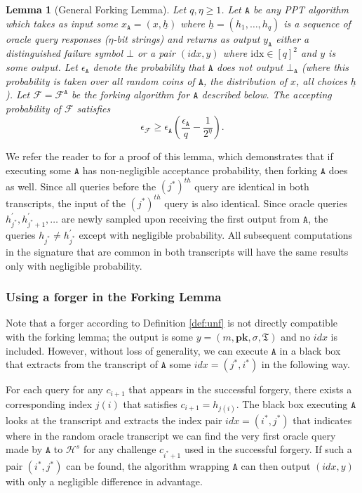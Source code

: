 \documentclass{mrl}
\theoremstyle{plain}
\newtheorem{lemma}{Lemma}[section]
\theoremstyle{definition}
\begin{document}
\begin{lemma}[General Forking Lemma]\label{lem:fork}
Let $q, \eta \geq 1$. Let $\texttt{A}$ be any PPT algorithm which takes as input some $x_\texttt{A} = (x, \underline{h})$ where $\underline{h} = (h_1, \ldots, h_q)$ is a sequence of oracle query responses ($\eta$-bit strings) and returns as output $y_{\texttt{A}}$ either a distinguished failure symbol $\bot$ or a pair $(\textit{idx}, y)$ where $\text{idx} \in [q]^2$ and $y$ is some output. Let $\epsilon_{\texttt{A}}$ denote the probability that $\texttt{A}$ does not output $\bot_{\texttt{A}}$ (where this probability is taken over all random coins of $\texttt{A}$, the distribution of $x$, all choices $\underline{h}$). Let $\mathcal{F} = \mathcal{F}^{\texttt{A}}$ be the forking algorithm for $\texttt{A}$ described below. The accepting probability of $\mathcal{F}$ satisfies \[\epsilon_{\mathcal{F}} \geq \epsilon_{\texttt{A}} \left(\frac{\epsilon_{\texttt{A}}}{q} - \frac{1}{2^\eta}\right).\]
\end{lemma}

We refer the reader to \cite{bellare} for a proof of this lemma, which demonstrates that if executing some $\texttt{A}$ has non-negligible acceptance probability, then forking $\texttt{A}$ does as well. Since all queries before the $(j^*)^{th}$ query are identical in both transcripts, the input of the $(j^*)^{th}$ query is also identical. Since oracle queries $h_{j^*}^{\prime}, h_{j^*+1}^{\prime}, \ldots$ are newly sampled upon receiving the first output from $\texttt{A}$, the queries $h_{j^*} \neq h_{j^*}^\prime$ except with negligible probability. All subsequent computations in the signature that are common in both transcripts will have the same results only with negligible probability. 


\subsubsection{Using a forger in the Forking Lemma}

Note that a forger according to Definition \ref{def:unf} is not directly compatible with the forking lemma; the output is some $y = (m, \textbf{pk}, \sigma, \mathfrak{T})$ and no $\textit{idx}$ is included.  However, without loss of generality, we can execute $\texttt{A}$ in a black box that extracts from the transcript of $\texttt{A}$ some $\textit{idx} = (j^*, i^*)$ in the following way. 

For each query for any $c_{i+1}$ that appears in the successful forgery, there exists a corresponding index $j(i)$ that satisfies $c_{i+1} = h_{j(i)}$. The black box executing $\texttt{A}$ looks at the transcript and extracts the index pair $\textit{idx} = (i^*, j^*)$ that indicates where in the random oracle transcript we can find the very first oracle query made by $\texttt{A}$ to $\mathcal{H}^s$ for any challenge $c_{i^*+1}$ used in the successful forgery. If such a pair $(i^*, j^*)$ can be found, the algorithm wrapping $\texttt{A}$ can then output $(\textit{idx}, y)$ with only a negligible difference in advantage. 
\end{document}
